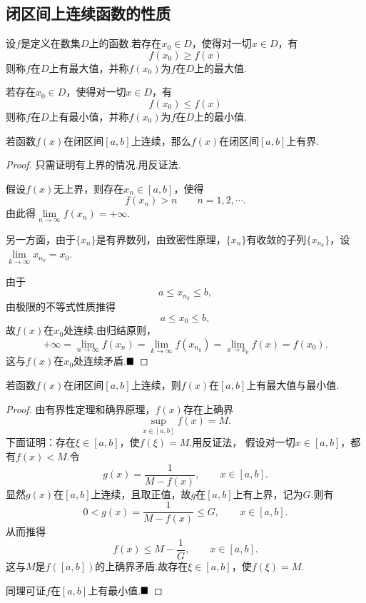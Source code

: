 \subsection{闭区间上连续函数的性质}
\begin{definition}[函数的最值]
	设$f$是定义在数集$D$上的函数.若存在$x_0\in D$，使得对一切$x\in D$，有
	$$f(x_0)\geqslant f(x)$$
	则称$f$在$D$上有最大值，并称$f(x_0)$为$f$在$D$上的最大值.
	
	若存在$x_0\in D$，使得对一切$x\in D$，有
	$$f(x_0)\leqslant f(x)$$
	则称$f$在$D$上有最小值，并称$f(x_0)$为$f$在$D$上的最小值.
\end{definition}
\begin{theorem}[有界性定理]
	若函数$f(x)$在闭区间$\left[a,b\right]$上连续，那么$f(x)$在闭区间$\left[a,b\right]$上有界.
\end{theorem}
\begin{proof}
	只需证明有上界的情况.用反证法.
	
	假设$f(x)$无上界，则存在$x_n\in\left[a,b\right]$，使得
	$$f(x_n)>n\qquad n=1,2,\cdots.$$
	由此得$\lim\limits_{n\to \infty}f(x_n)=+\infty$.
	
	另一方面，由于$\{x_n\}$是有界数列，由致密性原理，$\{x_n\}$有收敛的子列$\{x_{n_k}\}$，设$\lim\limits_{k\to\infty}x_{n_k}=x_0$.
	
	由于
	$$a\leqslant x_{n_k}\leqslant b,$$
	由极限的不等式性质推得
	$$a\leqslant x_0\leqslant b,$$
	故$f(x)$在$x_0$处连续.由归结原则，
	$$+\infty=\lim\limits_{n\to\infty}f(x_n)=\lim\limits_{k\to\infty}f(x_{n_k})=\lim\limits_{x\to x_0}f(x)=f(x_0).$$
	这与$f(x)$在$x_0$处连续矛盾.$\hfill\blacksquare$
\end{proof}
\begin{theorem}[最大、最小值定理]
	若函数$f(x)$在闭区间$\left[a,b\right]$上连续，则$f(x)$在$\left[a,b\right]$上有最大值与最小值.
\end{theorem}
\begin{proof}
	由有界性定理和确界原理，$f(x)$存在上确界
	$$\sup\limits_{x\in\left[a,b\right]}f(x)=M.$$
	下面证明：存在$\xi\in\left[a,b\right]$，使$f(\xi)=M$.用反证法，
	假设对一切$x\in\left[a,b\right]$，都有$f(x)<M$.令
	$$g(x)=\frac{1}{M-f(x)},\qquad x\in \left[a,b\right].$$
	显然$g(x)$在$\left[a,b\right]$上连续，且取正值，故$g$在$\left[a,b\right]$上有上界，记为$G$.则有
	$$0<g(x)=\frac{1}{M-f(x)}\leqslant G,\qquad x\in \left[a,b\right].$$
	从而推得
	$$f(x)\leqslant M-\frac{1}{G},\qquad x\in\left[a,b\right].$$
	这与$M$是$f(\left[a,b\right])$的上确界矛盾.故存在$\xi\in\left[a,b\right]$，使$f(\xi)=M$.
	
	同理可证$f$在$\left[a,b\right]$上有最小值.$\hfill\blacksquare$
\end{proof}
